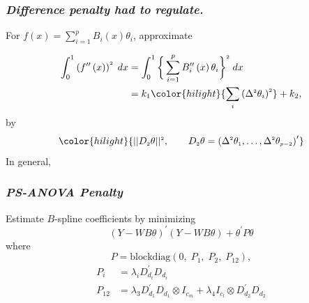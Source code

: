 \documentclass[12pt]{beamer}
\newcommand{\ms}{\scriptscriptstyle}
\newcommand{\newthought}[1]{{\small \color{hilight} {#1}}}
\newcommand{\newmaththought}[1]{{ \color{hilight} {#1}}}
\begin{document}
\begin{frame}
\frametitle{\emph{Difference penalty had to regulate.}}

For $f\left(x\right)=\sum \limits_{i=1}^{p} B_{i}\left(x\right) \theta_{i}$, approximate

\begin{align}
\begin{split}
\int_0^1 \left(f^{\prime \prime}\left(x\right)\right)^{\ms 2} \;dx &= \int_0^1 \bigg\{ \sum \limits_{i=1}^{p} B^{\prime \prime}_{i}\left(x\right) \theta_{i} \bigg\}^{\ms 2} \;dx \\ 
&= k_1 \newmaththought{\sum_i \left( \Delta^{\ms 2} \theta_i \right)^{\ms 2}} + k_2, 
\end{split}
\end{align}
\noindent
by
\[
\newmaththought{\vert \vert D_{\ms 2} \theta \vert \vert^{\ms 2}, \qquad  D_{\ms 2} \theta= \left( \Delta^{\ms 2}\theta_{\ms 1},\dots,\Delta^{\ms 2}\theta_{\ms{p-2}} \right)^\prime }
\]
In general, 
\framebox{\newthought{approximate} $\newmaththought{\int \limits_{\ms 0}^{\ms 1} \big(f^{\ms{\left(d\right)}}\big)^{\ms 2}\;dx}$ \newthought{with} $\newmaththought{\vert \vert D_{\ms d} \theta \vert \vert^{\ms 2} }$ }
\end{frame}


\begin{frame}
\frametitle{\emph{PS-ANOVA Penalty}}

Estimate $B$-spline coefficients by minimizing 
\begin{equation*}
\left(Y-WB\theta\right)^\prime \left(Y-WB\theta\right) + \theta^\prime P \theta
\end{equation*}
\noindent
where
\begin{equation} \label{eq:PSANOVA-penalty}
P = \mbox{blockdiag}\left(0,\; P_1, \; P_2, \; P_{12}\right),
\end{equation}
\begin{align*}
P_{\ms i} &= \lambda_i D_{\ms{d_i}}^\prime D_{\ms{d_i}}\\
P_{\ms{12}} &= \lambda_3 D_{\ms{d_1}}^\prime D_{\ms{d_1}} \otimes I_{\ms{c_m}} + \lambda_4 I_{\ms{c_l}} \otimes D_{\ms{d_2}}^\prime D_{\ms{d_2}} 
\end{align*}


\end{frame}
\end{document}
